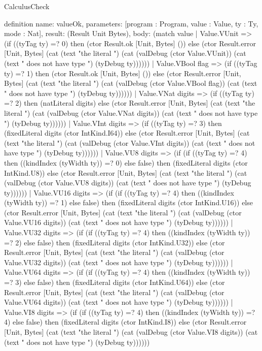 \begin{lexlean}{CalculusCheck}
\begin{semanticmodule}
definition{
  name: valueOk,
  parameters: [program : Program, value : Value, ty : Ty, mode : Nat],
  result: (Result Unit Bytes),
  body: (match value
    | Value.VUnit => (if ((tyTag ty) =? 0) then (ctor Result.ok [Unit, Bytes] ()) else (ctor Result.error [Unit, Bytes] (cat (text "the literal ") (cat (valDebug (ctor Value.VUnit)) (cat (text " does not have type ") (tyDebug ty))))))
    | Value.VBool flag => (if ((tyTag ty) =? 1) then (ctor Result.ok [Unit, Bytes] ()) else (ctor Result.error [Unit, Bytes] (cat (text "the literal ") (cat (valDebug (ctor Value.VBool flag)) (cat (text " does not have type ") (tyDebug ty))))))
    | Value.VNat digits => (if ((tyTag ty) =? 2) then (natLiteral digits) else (ctor Result.error [Unit, Bytes] (cat (text "the literal ") (cat (valDebug (ctor Value.VNat digits)) (cat (text " does not have type ") (tyDebug ty))))))
    | Value.VInt digits => (if ((tyTag ty) =? 3) then (fixedLiteral digits (ctor IntKind.I64)) else (ctor Result.error [Unit, Bytes] (cat (text "the literal ") (cat (valDebug (ctor Value.VInt digits)) (cat (text " does not have type ") (tyDebug ty))))))
    | Value.VU8 digits => (if (if ((tyTag ty) =? 4) then ((kindIndex (tyWidth ty)) =? 0) else false) then (fixedLiteral digits (ctor IntKind.U8)) else (ctor Result.error [Unit, Bytes] (cat (text "the literal ") (cat (valDebug (ctor Value.VU8 digits)) (cat (text " does not have type ") (tyDebug ty))))))
    | Value.VU16 digits => (if (if ((tyTag ty) =? 4) then ((kindIndex (tyWidth ty)) =? 1) else false) then (fixedLiteral digits (ctor IntKind.U16)) else (ctor Result.error [Unit, Bytes] (cat (text "the literal ") (cat (valDebug (ctor Value.VU16 digits)) (cat (text " does not have type ") (tyDebug ty))))))
    | Value.VU32 digits => (if (if ((tyTag ty) =? 4) then ((kindIndex (tyWidth ty)) =? 2) else false) then (fixedLiteral digits (ctor IntKind.U32)) else (ctor Result.error [Unit, Bytes] (cat (text "the literal ") (cat (valDebug (ctor Value.VU32 digits)) (cat (text " does not have type ") (tyDebug ty))))))
    | Value.VU64 digits => (if (if ((tyTag ty) =? 4) then ((kindIndex (tyWidth ty)) =? 3) else false) then (fixedLiteral digits (ctor IntKind.U64)) else (ctor Result.error [Unit, Bytes] (cat (text "the literal ") (cat (valDebug (ctor Value.VU64 digits)) (cat (text " does not have type ") (tyDebug ty))))))
    | Value.VI8 digits => (if (if ((tyTag ty) =? 4) then ((kindIndex (tyWidth ty)) =? 4) else false) then (fixedLiteral digits (ctor IntKind.I8)) else (ctor Result.error [Unit, Bytes] (cat (text "the literal ") (cat (valDebug (ctor Value.VI8 digits)) (cat (text " does not have type ") (tyDebug ty))))))
}
\end{semanticmodule}
\end{lexlean}
